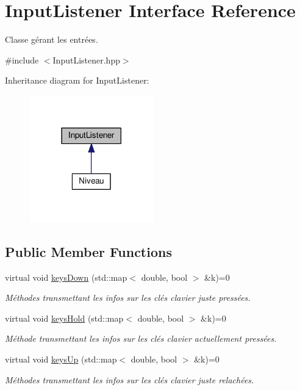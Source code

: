 \hypertarget{class_input_listener}{}\section{Input\+Listener Interface Reference}
\label{class_input_listener}


Classe gérant les entrées.  




{\ttfamily \#include $<$Input\+Listener.\+hpp$>$}



Inheritance diagram for Input\+Listener\+:\nopagebreak
\begin{figure}[H]
\begin{center}
\leavevmode
\includegraphics[width=153pt]{class_input_listener__inherit__graph}
\end{center}
\end{figure}
\subsection*{Public Member Functions}
\begin{DoxyCompactItemize}
\item 
virtual void \hyperlink{class_input_listener_a415245dec47d3e80be64b779859a90c9}{keys\+Down} (std\+::map$<$ double, bool $>$ \&k)=0
\begin{DoxyCompactList}\small\item\em Méthodes transmettant les infos sur les clés clavier juste pressées. \end{DoxyCompactList}\item 
virtual void \hyperlink{class_input_listener_a0a9bea1bfdcb82a827a48ad35d692600}{keys\+Hold} (std\+::map$<$ double, bool $>$ \&k)=0
\begin{DoxyCompactList}\small\item\em Méthode transmettant les infos sur les clés clavier actuellement pressées. \end{DoxyCompactList}\item 
virtual void \hyperlink{class_input_listener_a188edcf4460b5db1081ddd7b9f271175}{keys\+Up} (std\+::map$<$ double, bool $>$ \&k)=0
\begin{DoxyCompactList}\small\item\em Méthodes transmettant les infos sur les clés clavier juste relachées. \end{DoxyCompactList}\end{DoxyCompactItemize}


